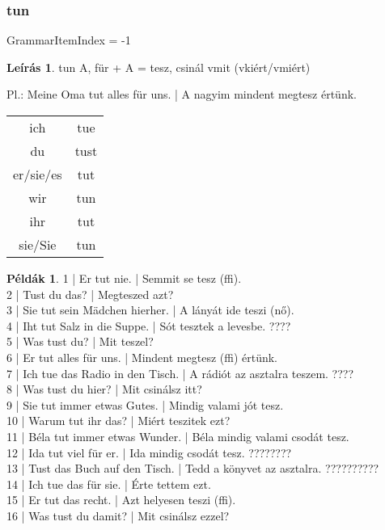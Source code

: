 \documentclass{article}
\theoremstyle{definition}
\newtheorem*{exmp}{Példák}
\newtheorem*{desc}{Leírás}
\begin{document}
\subsubsection{tun}

GrammarItemIndex = -1

\begin{desc}
tun A, für + A = tesz, csinál vmit (vkiért/vmiért)

Pl.: Meine Oma tut alles für uns. | A nagyim mindent megtesz értünk.

\begin{tabular}{cc}
 ich & tue \\
 du & tust \\
 er/sie/es & tut \\
 wir & tun \\
 ihr & tut \\
 sie/Sie & tun \\
\end{tabular}
\end{desc}

\begin{exmp}
1 | Er tut nie. | Semmit se tesz (ffi).\\
2 | Tust du das? | Megteszed azt?\\
3 | Sie tut sein Mädchen hierher. | A lányát ide teszi (nő).\\
4 | Iht tut Salz in die Suppe. | Sót tesztek a levesbe. ????\\
5 | Was tust du? | Mit teszel?\\
6 | Er tut alles für uns. | Mindent megtesz (ffi) értünk.\\
7 | Ich tue das Radio in den Tisch. | A rádiót az asztalra teszem. ????\\
8 | Was tust du hier? | Mit csinálsz itt?\\
9 | Sie tut immer etwas Gutes. | Mindig valami jót tesz.\\
10 | Warum tut ihr das? | Miért teszitek ezt?\\
11 | Béla tut immer etwas Wunder. | Béla mindig valami csodát tesz.\\
12 | Ida tut viel für er. | Ida mindig csodát tesz. ????????\\
13 | Tust das Buch auf den Tisch. | Tedd a könyvet az asztalra. ??????????\\
14 | Ich tue das für sie. | Érte tettem ezt.\\
15 | Er tut das recht. | Azt helyesen teszi (ffi).\\
16 | Was tust du damit? | Mit csinálsz ezzel?\\
\end{exmp}
\end{document}
